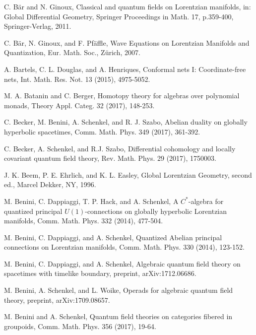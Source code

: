\documentclass{amsbook}
\numberwithin{section}{chapter}
\numberwithin{subsection}{section}
\numberwithin{equation}{section}
\theoremstyle{plain}
\theoremstyle{definition}
\begin{document}

\begin{thebibliography}{AAAAAA}
C. B\"{a}r and N. Ginoux, Classical and quantum fields on Lorentzian manifolds, in: Global Differential Geometry, Springer Proceedings in Math. 17, p.359-400, Springer-Verlag, 2011.

C. B\"{a}r, N. Ginoux, and F. Pf\"{a}ffle, Wave Equations on Lorentzian Manifolds and Quantization, Eur. Math. Soc., Z\"{u}rich,  2007.

A. Bartels, C. L. Douglas, and A. Henriques, Conformal nets I: Coordinate-free nets, Int. Math. Res. Not. 13 (2015), 4975-5052. 

M. A. Batanin and C. Berger, Homotopy theory for algebras over polynomial monads, Theory Appl. Categ. 32 (2017), 148-253.

C. Becker, M. Benini, A. Schenkel, and R. J. Szabo, Abelian duality on globally
hyperbolic spacetimes, Comm. Math. Phys. 349 (2017), 361-392.

C. Becker, A. Schenkel, and R.J. Szabo, Differential cohomology and locally covariant quantum field theory, Rev. Math. Phys. 29 (2017), 1750003.

J. K. Beem, P. E. Ehrlich, and K.  L. Easley, Global Lorentzian Geometry, second ed., Marcel Dekker, NY, 1996.

M. Benini, C. Dappiaggi, T. P. Hack, and A. Schenkel, A $C^*$-algebra for quantized principal $U(1)$-connections on globally hyperbolic Lorentzian manifolds, Comm. Math. Phys. 332 (2014), 477-504.

M. Benini, C. Dappiaggi, and A. Schenkel, Quantized Abelian principal connections on Lorentzian manifolds, Comm. Math. Phys. 330 (2014), 123-152.

M. Benini, C. Dappiaggi, and A. Schenkel, Algebraic quantum field theory on spacetimes with timelike boundary, preprint, arXiv:1712.06686.

M. Benini, A. Schenkel, and L. Woike, Operads for algebraic quantum field theory, preprint, arXiv:1709.08657.

M. Benini and A. Schenkel, Quantum field theories on categories fibered in groupoids, Comm. Math. Phys. 356 (2017), 19-64.


\end{thebibliography}
\end{document}
